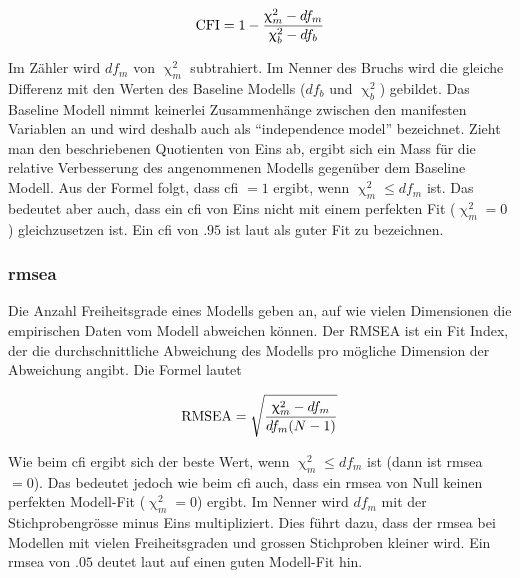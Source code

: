 \documentclass[11pt, twoside, a4paper]{book}		%
\begin{document}
$$ \textnormal{CFI} = 1 - \frac{\upchi^2_{m}-df_{m}}{\upchi^2_{b}-df_{b}} $$

\noindent Im Zähler wird $df_{m}$ von $\upchi^2_{m}$ subtrahiert. Im Nenner des Bruchs wird die gleiche Differenz mit den Werten des Baseline Modells ($df_{b}$ und $\upchi^2_{b}$) gebildet.
Das Baseline Modell nimmt keinerlei Zusammenhänge zwischen den manifesten Variablen an und wird deshalb auch als \enquote{independence model} bezeichnet. Zieht man den beschriebenen Quotienten von Eins ab, ergibt sich ein Mass für die relative Verbesserung des angenommenen Modells gegenüber dem Baseline Modell. Aus der Formel folgt, dass \gls{cfi} $= 1$ ergibt, wenn $\upchi^2_{m} \leq df_{m}$ ist. Das bedeutet aber auch, dass ein \gls{cfi} von Eins nicht mit einem perfekten Fit ($\upchi^2_{m} = 0$) gleichzusetzen ist. Ein \gls{cfi} von $.95$ ist laut \citet{Hu1999} als guter Fit zu bezeichnen.

\subsubsection*{\gls{rmsea}}
Die Anzahl Freiheitsgrade eines Modells geben an, auf wie vielen Dimensionen die empirischen Daten vom Modell abweichen können. Der RMSEA \citep{Steiger1990} ist ein Fit Index, der die durchschnittliche Abweichung des Modells pro mögliche Dimension der Abweichung angibt. Die Formel lautet

$$ \textnormal{RMSEA} = \sqrt{ \frac{\upchi^2_{m}-df_{m}}{df_{m}(N-1)} } $$

\noindent Wie beim \gls{cfi} ergibt sich der beste Wert, wenn $\upchi^2_{m} \leq df_{m}$ ist (dann ist \gls{rmsea} $= 0$). Das bedeutet jedoch wie beim \gls{cfi} auch, dass ein \gls{rmsea} von Null keinen perfekten Modell-Fit ($\upchi^2_{m} = 0$) ergibt. Im Nenner wird $df_{m}$ mit der Stichprobengrösse minus Eins multipliziert. Dies führt dazu, dass der \gls{rmsea} bei Modellen mit vielen Freiheitsgraden und grossen Stichproben kleiner wird. Ein \gls{rmsea} von $.05$ deutet laut \citet{Browne1993} auf einen guten Modell-Fit hin.
\end{document}

